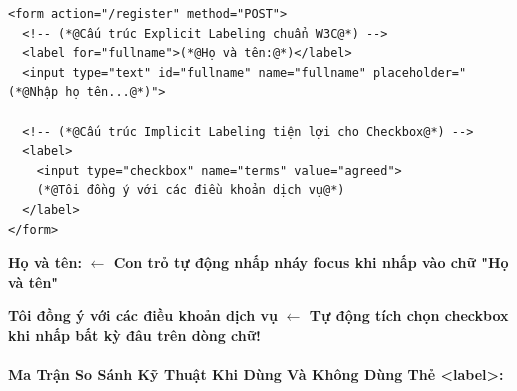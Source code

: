 \begin{codeWindow}
\begin{lstlisting}[language=HTML5]
<form action="/register" method="POST">
  <!-- (*@Cấu trúc Explicit Labeling chuẩn W3C@*) -->
  <label for="fullname">(*@Họ và tên:@*)</label>
  <input type="text" id="fullname" name="fullname" placeholder="(*@Nhập họ tên...@*)">
  
  <!-- (*@Cấu trúc Implicit Labeling tiện lợi cho Checkbox@*) -->
  <label>
    <input type="checkbox" name="terms" value="agreed">
    (*@Tôi đồng ý với các điều khoản dịch vụ@*)
  </label>
</form>
\end{lstlisting}
\end{codeWindow}

\begin{browserWindow}
\sffamily\small
\begin{tcolorbox}[enhanced, colback=white, colframe=primaryBlue!30, arc=6pt, boxrule=0.8pt, left=12pt, right=12pt, top=10pt, bottom=10pt]
  \textbf{Họ và tên:} \quad \tcbox[on line, arc=4pt, colback=primaryBlue!5, colframe=primaryBlue, boxsep=3pt, left=8pt, right=40pt]{\textcolor{darkText}{Nguyễn Văn A} \;\textcolor{primaryBlue}{\textbf{|}}} \quad \textcolor{primaryBlue}{\small\textbf{$\leftarrow$ Con trỏ tự động nhấp nháy focus khi nhấp vào chữ "Họ và tên"}}
  
  \vspace{10pt}
  
   \;\textbf{Tôi đồng ý với các điều khoản dịch vụ} \quad \textcolor{secondaryTeal}{\small\textbf{$\leftarrow$ Tự động tích chọn checkbox khi nhấp bất kỳ đâu trên dòng chữ!}}
\end{tcolorbox}
\end{browserWindow}

\paragraph{Ma Trận So Sánh Kỹ Thuật Khi Dùng Và Không Dùng Thẻ <label>:}

